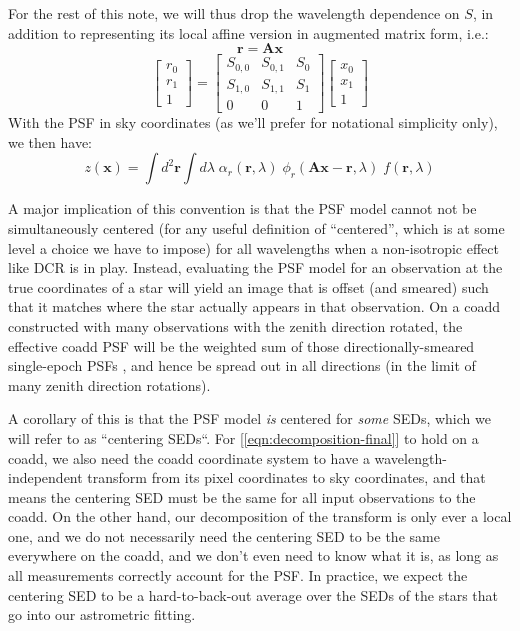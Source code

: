 \documentclass[DM,authoryear,toc]{lsstdoc}
\begin{document}
For the rest of this note, we will thus drop the wavelength dependence on $S$, in addition to representing its local affine version in augmented matrix form, i.e.:
\begin{equation}
  \mathbf{r} = \mathbf{A} \mathbf{x}
\end{equation}
\begin{equation}
\begin{bmatrix}
    r_0 \\
    r_1 \\
    1
  \end{bmatrix} =
  \begin{bmatrix}
    S_{0, 0} & S_{0, 1} & S_0 \\
    S_{1, 0} & S_{1, 1} & S_1 \\
    0 & 0 & 1
  \end{bmatrix}
  \begin{bmatrix}
    x_0 \\
    x_1 \\
    1
  \end{bmatrix}
\end{equation}
With the PSF in sky coordinates (as we'll prefer for notational simplicity only), we then have:
\begin{equation}
  z(\mathbf{x}) =  \int\!\! d^2 \mathbf{r} \int\!\! d\!\lambda
    \; \alpha_r(\mathbf{r}, \lambda)
    \; \phi_r\!\left(\mathbf{A}\mathbf{x} - \mathbf{r}, \lambda\right)
    \; f\!\left(\mathbf{r}, \lambda\right)
  \label{eqn:decomposition-final}
\end{equation}

A major implication of this convention is that the PSF model cannot not be simultaneously centered (for any useful definition of ``centered'', which is at some level a choice we have to impose) for all wavelengths when a non-isotropic effect like DCR is in play.
Instead, evaluating the PSF model for an observation at the true coordinates of a star will yield an image that is offset (and smeared) such that it matches where the star actually appears in that observation.
On a coadd constructed with many observations with the zenith direction rotated, the effective coadd PSF will be the weighted sum of those directionally-smeared single-epoch PSFs \citep{2023OJAp....6E...5M}, and hence be spread out in all directions (in the limit of many zenith direction rotations).

A corollary of this is that the PSF model \emph{is} centered for \emph{some} SEDs, which we will refer to as ``centering SEDs``.
For [\ref{eqn:decomposition-final}] to hold on a coadd, we also need the coadd coordinate system to have a wavelength-independent transform from its pixel coordinates to sky coordinates, and that means the centering SED must be the same for all input observations to the coadd.
On the other hand, our decomposition of the transform is only ever a local one, and we do not necessarily need the centering SED to be the same everywhere on the coadd, and we don't even need to know what it is, as long as  all measurements correctly account for the PSF.
In practice, we expect the centering SED to be a hard-to-back-out average over the SEDs of the stars that go into our astrometric fitting.
\end{document}
